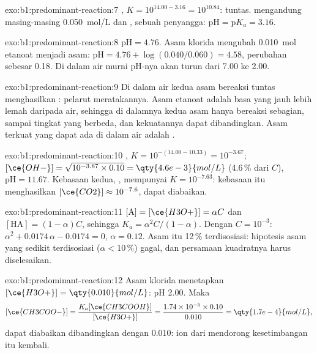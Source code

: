 \begin{solution}{exo:b1:predominant-reaction:7}
, $K = 10^{14.00 - 3.16} = 10^{10.84}$: tuntas.
 mengandung masing-masing \qty{0.050}{mol/L} 
dan , sebuah penyangga: $\mathrm{pH} = \mathrm{p}K_a = 3.16$.
\end{solution}

\begin{solution}{exo:b1:predominant-reaction:8}
$\mathrm{pH} = 4.76$. Asam klorida mengubah \qty{0.010}{mol} etanoat
menjadi asam: $\mathrm{pH} = 4.76 + \log(0.040/0.060) = 4.58$, perubahan
sebesar 0.18. Di dalam air murni pH-nya akan turun dari 7.00 ke 2.00.
\end{solution}

\begin{solution}{exo:b1:predominant-reaction:9}
Di dalam air kedua asam bereaksi tuntas menghasilkan : pelarut
meratakannya. Asam etanoat adalah basa yang jauh lebih lemah daripada
air, sehingga di dalamnya kedua asam hanya bereaksi sebagian, sampai
tingkat yang berbeda, dan kekuatannya dapat dibandingkan. Asam terkuat
yang dapat ada di dalam air adalah .
\end{solution}

\begin{solution}{exo:b1:predominant-reaction:10}
, $K = 10^{-(14.00 - 10.33)} = 10^{-3.67}$;
$[\ce{OH-}] = \sqrt{10^{-3.67} \times 0.10} = \qty{4.6e-3}{mol/L}$
(4.6\,\% dari $C$), $\mathrm{pH} = 11.67$. Kebasaan kedua, , mempunyai $K = 10^{-7.63}$: kebasaan itu menghasilkan
$[\ce{CO2}] \approx
10^{-7.6}$, dapat diabaikan.
\end{solution}

\begin{solution}{exo:b1:predominant-reaction:11}
$[\mathrm{A}] = [\ce{H3O+}] = \alpha C$ dan $[\mathrm{HA}] = (1 - \alpha)C$,
sehingga $K_a = \alpha^2C/(1 - \alpha)$. Dengan $C = 10^{-3}$: $\alpha^2 +
0.0174\,\alpha - 0.0174 = 0$, $\alpha = 0.12$. Asam itu 12\,\%
terdisosiasi: hipotesis asam yang sedikit terdisosiasi ($\alpha <
10\,\%$) gagal, dan persamaan kuadratnya harus diselesaikan.
\end{solution}

\begin{solution}{exo:b1:predominant-reaction:12}
Asam klorida menetapkan $[\ce{H3O+}] = \qty{0.010}{mol/L}$: pH 2.00. Maka
\[
  [\ce{CH3COO-}] = \frac{K_a[\ce{CH3COOH}]}{[\ce{H3O+}]} = \frac{1.74 \times 10^{-5}
  \times 0.10}{0.010} = \qty{1.7e-4}{mol/L},
\]
dapat diabaikan dibandingkan dengan 0.010: ion
 dari  mendorong kesetimbangan  itu
kembali.
\end{solution}

